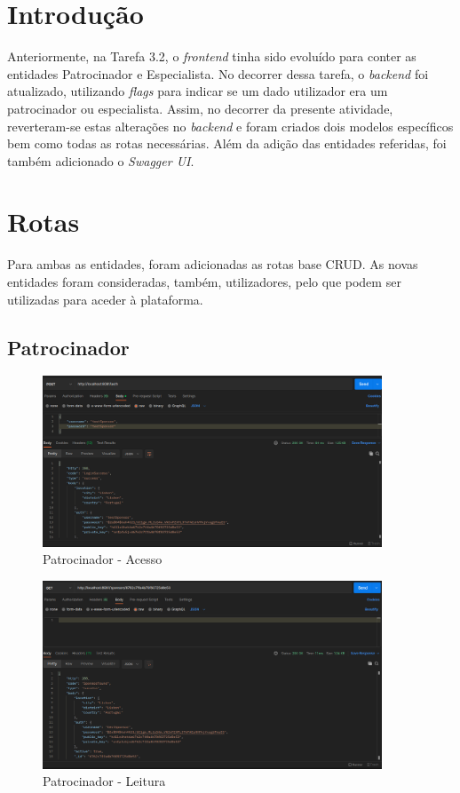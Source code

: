 \documentclass[12pt,a4paper,final]{article}
\begin{document}
    \section{Introdução}\label{sec:introducao}
    Anteriormente, na Tarefa 3.2, o \textit{frontend} tinha sido evoluído para conter as entidades Patrocinador e Especialista.
    No decorrer dessa tarefa, o \textit{backend} foi atualizado, utilizando \textit{flags} para indicar se um dado utilizador era um patrocinador ou especialista.
    Assim, no decorrer da presente atividade, reverteram-se estas alterações no \textit{backend} e foram criados dois modelos específicos bem como todas as rotas necessárias.
    Além da adição das entidades referidas, foi também adicionado o \textit{Swagger UI}.


    \section{Rotas}\label{sec:patrocinador}
    Para ambas as entidades, foram adicionadas as rotas base CRUD.
    As novas entidades foram consideradas, também, utilizadores, pelo que podem ser utilizadas para aceder à plataforma.

    \subsection{Patrocinador}\label{subsec:patrocinador}
    \begin{figure}[H]
        \centering
        \includegraphics[width=0.9\textwidth]{login_sponsor}
        \caption{Patrocinador - Acesso}
        \label{fig:login_sponsor}
    \end{figure}

    \begin{figure}[H]
        \centering
        \includegraphics[width=0.9\textwidth]{get_sponsor}
        \caption{Patrocinador - Leitura}
        \label{fig:get_sponsor}
    \end{figure}
\end{document}
